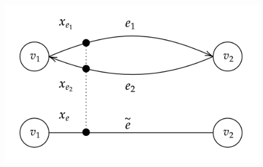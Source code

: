 \documentclass[9pt]{beamer}
\begin{document}
\begin{frame}
    \begin{figure}[H]
        \begin{center}
            \includegraphics[scale=0.25]{img/diagram-20220315 (2).png}
        \end{center}
    \end{figure}
\end{frame}
\end{document}

